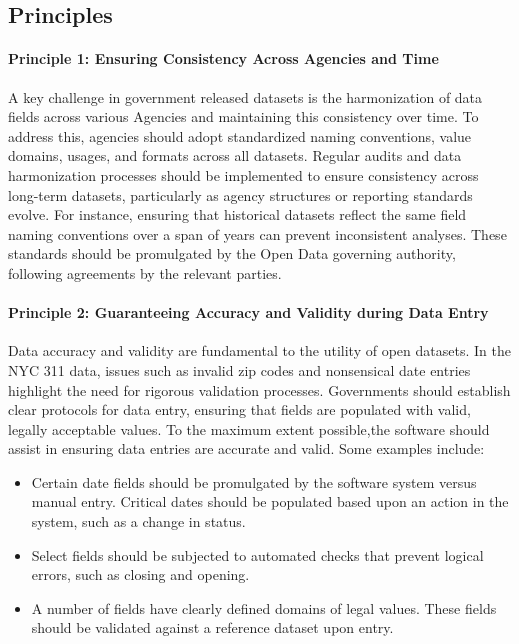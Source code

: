 \documentclass[linenumber]{jdsart}
\begin{document}
\subsection{Principles}
\paragraph{Principle 1: Ensuring Consistency Across Agencies and Time}
A key challenge in government released datasets is the 
harmonization of data fields across various Agencies and 
maintaining this consistency over time. To address this, agencies should adopt 
standardized naming conventions, value domains, usages, and 
formats across all datasets. Regular audits and data harmonization 
processes should be implemented to ensure consistency 
across long\mbox{-}term datasets, particularly as agency structures 
or reporting standards evolve. For instance, ensuring that 
historical datasets reflect the same field naming conventions 
over a span of years can prevent inconsistent analyses. 
These standards should be promulgated by the Open Data 
governing authority, following agreements by the relevant parties.

\paragraph{Principle 2: Guaranteeing Accuracy and Validity during Data Entry}
Data accuracy and validity are fundamental to the utility of 
open datasets. In the NYC 311 data, issues such as 
invalid zip codes and nonsensical date entries 
highlight the need for rigorous validation processes. Governments 
should establish clear protocols for data entry, ensuring that 
fields are populated with valid, legally acceptable values. To 
the maximum extent possible,the software should assist in 
ensuring data entries are accurate and valid. Some examples include:

\begin{itemize}[left=1.5em]
    \item Certain date fields should be promulgated by the software
    system versus manual entry. Critical dates should be populated
    based upon an action in the system, such as a change in status. 
       
    \item Select fields should be subjected to automated checks 
    that prevent logical errors, such as closing and opening. 
    
    \item A number of fields have clearly defined domains of legal
    values. These fields should be validated against a reference 
    dataset upon entry. 
 \end{itemize}
\end{document}
